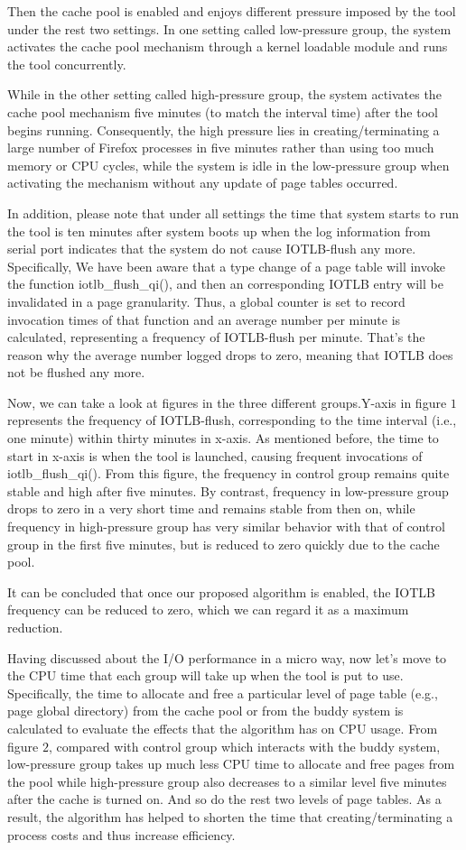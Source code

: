 \documentclass[letterpaper,twocolumn,10pt]{article}
\begin{document}
Then the cache pool is enabled and enjoys different pressure imposed by the tool under the rest two settings. In one setting called low-pressure group, the system activates the cache pool mechanism through a kernel loadable module and runs the tool concurrently.

While in the other setting called high-pressure group, the system activates the cache pool mechanism five minutes (to match the interval time) after the tool begins running. Consequently, the high pressure lies in creating/terminating a large number of Firefox processes in five minutes rather than using too much memory or CPU cycles, while the system is idle in the low-pressure group when activating the mechanism without any update of page tables occurred.

In addition, please note that under all settings the time that system starts to run the tool is ten minutes after system boots up when the log information from serial port indicates that the system do not cause IOTLB-flush any more. Specifically, We have been aware that a type change of a page table will invoke the function iotlb\_flush\_qi(), and then an corresponding IOTLB entry will be invalidated in a page granularity. Thus, a global counter is set to record invocation times of that function and an average number per minute is calculated, representing a frequency of IOTLB-flush per minute. That’s the reason why the average number logged drops to zero, meaning that IOTLB does not be flushed any more.

Now, we can take a look at figures in the three different groups.Y-axis in figure $1$ represents the frequency of IOTLB-flush, corresponding to the time interval (i.e., one minute) within thirty minutes in x-axis. As mentioned before, the time to start in x-axis is when the tool is launched, causing frequent invocations of iotlb\_flush\_qi().
From this figure, the frequency in control group remains quite stable and high after five minutes. By contrast, frequency in low-pressure group drops to zero in a very short time and remains stable from then on, while frequency in high-pressure group has very similar behavior with that of control group in the first five minutes, but is reduced to zero quickly due to the cache pool.

It can be concluded that once our proposed algorithm is enabled, the IOTLB frequency can be reduced to zero, which we can regard it as a maximum reduction.

Having discussed about the I/O performance in a micro way, now let’s move to the CPU time that each group will take up when the tool is put to use. Specifically, the time to allocate and free a particular level of page table (e.g., page global directory) from the cache pool or from the buddy system is calculated to evaluate the effects that the algorithm has on CPU usage. From figure $2$, compared with control group which interacts with the buddy system, low-pressure group takes up much less CPU time to allocate and free pages from the pool while high-pressure group also decreases to a similar level five minutes after the cache is turned on. And so do the rest two levels of page tables. As a result, the algorithm has helped to shorten the time that creating/terminating a process costs and thus increase efficiency.
\end{document}
